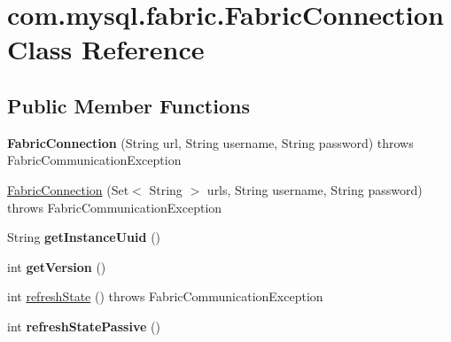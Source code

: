 \hypertarget{classcom_1_1mysql_1_1fabric_1_1_fabric_connection}{}\section{com.\+mysql.\+fabric.\+Fabric\+Connection Class Reference}
\label{classcom_1_1mysql_1_1fabric_1_1_fabric_connection}
\subsection*{Public Member Functions}
\begin{DoxyCompactItemize}
\item 
\mbox{\label{classcom_1_1mysql_1_1fabric_1_1_fabric_connection_ad3552e9fbdef5f8b076182c8a34ab337}} 
{\bfseries Fabric\+Connection} (String url, String username, String password)  throws Fabric\+Communication\+Exception 
\item 
\mbox{\hyperlink{classcom_1_1mysql_1_1fabric_1_1_fabric_connection_a8d7d3ea0363c352f69ef2b4c6f311637}{Fabric\+Connection}} (Set$<$ String $>$ urls, String username, String password)  throws Fabric\+Communication\+Exception 
\item 
\mbox{\label{classcom_1_1mysql_1_1fabric_1_1_fabric_connection_a3b88c9f9951d44aba25e827a1ad0a841}} 
String {\bfseries get\+Instance\+Uuid} ()
\item 
\mbox{\label{classcom_1_1mysql_1_1fabric_1_1_fabric_connection_a594b4b7b7f94b95b3dc10d3a5962a20b}} 
int {\bfseries get\+Version} ()
\item 
int \mbox{\hyperlink{classcom_1_1mysql_1_1fabric_1_1_fabric_connection_aa008c3c21505a6a3cd81dbe20c8ca9f0}{refresh\+State}} ()  throws Fabric\+Communication\+Exception 
\item 
\mbox{\label{classcom_1_1mysql_1_1fabric_1_1_fabric_connection_aeb271deac0f538b21b16bc6c7bbd9f41}} 
int {\bfseries refresh\+State\+Passive} ()
\item 
\mbox{\label{classcom_1_1mysql_1_1fabric_1_1_fabric_connection_a3258ace24dbdfe645935d44acfc76c79}} 

\end{DoxyCompactItemize}
